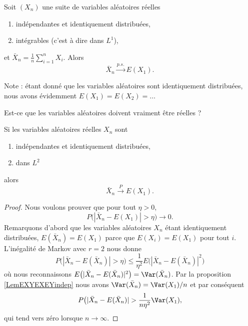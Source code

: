 \begin{theorem}
    Soit \( (X_n)\) une suite de variables aléatoires réelles
    \begin{enumerate}
        \item
            indépendantes et identiquement distribuées,
        \item
            intégrables (c'est à dire dans \( L^1\)),
    \end{enumerate}
    et \( \bar X_n=\frac{1}{ n }\sum_{i=1}^nX_i\). Alors
    \begin{equation}
        \bar X_n\stackrel{p.s.}{\longrightarrow} E(X_1).
    \end{equation}
\end{theorem}
Note : étant donné que les variables aléatoires sont identiquement distribuées, nous avons évidemment \( E(X_1)=E(X_2)=\ldots\)

\begin{probleme}
    Est-ce que les variables aléatoires doivent vraiment être réelles ?
\end{probleme}

\begin{corollary}
    Si les variables aléatoires réelles \( X_n\) sont
    \begin{enumerate}
        \item
            indépendantes et identiquement distribuées,
        \item
            dans \( L^2\)
    \end{enumerate}
    alors
    \begin{equation}
        \bar X_n\stackrel{P}{\longrightarrow}E(X_1).
    \end{equation}
\end{corollary}

\begin{proof}
    Nous voulons prouver que pour tout \( \eta>0\),
    \begin{equation}
        P\big( | \bar X_n-E(X_1) |>\eta \big)\to 0.
    \end{equation}
    Remarquons d'abord que les variables aléatoires \( X_n\) étant identiquement distribuées, \( E(\bar X_n)=E(X_1)\) parce que \( E(X_i)=E(X_1)\) pour tout \( i\). L'inégalité de Markov avec \( r=2\) nous donne
    \begin{equation}
        P\big( | \bar X_n-E(\bar X_n) |>\eta \big)\leq\frac{1}{ \eta^2 }E\big( | \bar X_n-E(\bar X_n) |^2 \big)
    \end{equation}
    où nous reconnaissons \( E\big( | \bar X_n-E(\bar X_n) |^2 \big)=\Var(\bar X_n)\). Par la proposition \ref{LemEXYEXEYindep} nous avons \( \Var(\bar X_n)=\Var(X_1)/n\) et par conséquent
    \begin{equation}
        P\big( | \bar X_n-E(\bar X_n) |>\frac{1}{ n\eta^2 }\Var(X_1),
    \end{equation}
    qui tend vers zéro lorsque \( n\to\infty\).
\end{proof}

